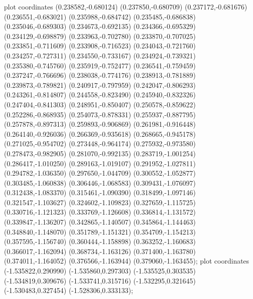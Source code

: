 { plot coordinates {(0.238582,-0.680124) (0.237850,-0.680709) (0.237172,-0.681676) (0.236551,-0.683021) (0.235988,-0.684742) (0.235485,-0.686838) (0.235046,-0.689303) (0.234673,-0.692135) (0.234366,-0.695329) (0.234129,-0.698879) (0.233963,-0.702780) (0.233870,-0.707025) (0.233851,-0.711609) (0.233908,-0.716523) (0.234043,-0.721760) (0.234257,-0.727311) (0.234550,-0.733167) (0.234924,-0.739321) (0.235380,-0.745760) (0.235919,-0.752477) (0.236541,-0.759459) (0.237247,-0.766696) (0.238038,-0.774176) (0.238913,-0.781889) (0.239873,-0.789821) (0.240917,-0.797959) (0.242047,-0.806293) (0.243261,-0.814807) (0.244558,-0.823490) (0.245940,-0.832326) (0.247404,-0.841303) (0.248951,-0.850407) (0.250578,-0.859622) (0.252286,-0.868935) (0.254073,-0.878331) (0.255937,-0.887795) (0.257878,-0.897313) (0.259893,-0.906869) (0.261981,-0.916448) (0.264140,-0.926036) (0.266369,-0.935618) (0.268665,-0.945178) (0.271025,-0.954702) (0.273448,-0.964174) (0.275932,-0.973580) (0.278473,-0.982905) (0.281070,-0.992135) (0.283719,-1.001254) (0.286417,-1.010250) (0.289163,-1.019107) (0.291952,-1.027811) (0.294782,-1.036350) (0.297650,-1.044709) (0.300552,-1.052877) (0.303485,-1.060838) (0.306446,-1.068583) (0.309431,-1.076097) (0.312438,-1.083370) (0.315461,-1.090390) (0.318499,-1.097146) (0.321547,-1.103627) (0.324602,-1.109823) (0.327659,-1.115725) (0.330716,-1.121323) (0.333769,-1.126608) (0.336814,-1.131572) (0.339847,-1.136207) (0.342865,-1.140507) (0.345864,-1.144463) (0.348840,-1.148070) (0.351789,-1.151321) (0.354709,-1.154213) (0.357595,-1.156740) (0.360444,-1.158898) (0.363252,-1.160683) (0.366017,-1.162094) (0.368734,-1.163126) (0.371400,-1.163780) (0.374011,-1.164052) (0.376566,-1.163944) (0.379060,-1.163455)};
 plot coordinates {(-1.535822,0.290990) (-1.535860,0.297303) (-1.535525,0.303535) (-1.534819,0.309676) (-1.533741,0.315716) (-1.532295,0.321645) (-1.530483,0.327454) (-1.528306,0.333133)};
}
